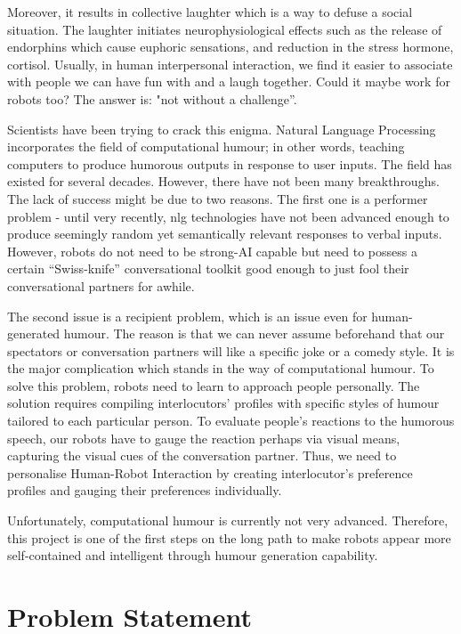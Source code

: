 Moreover, it results in collective laughter which is a way to defuse a social situation. The laughter initiates neurophysiological effects such as the release of endorphins which cause euphoric sensations, and reduction in the stress hormone, cortisol. Usually, in human interpersonal interaction, we find it easier to associate with people we can have fun with and a laugh together. Could it maybe work for robots too? The answer is: "not without a challenge”. 

Scientists have been trying to crack this enigma. Natural Language Processing incorporates the field of computational humour; in other words, teaching computers to produce humorous outputs in response to user inputs. The field has existed for several decades. However, there have not been many breakthroughs. The lack of success might be due to two reasons. The first one is a performer problem - until very recently, \acrfull{nlg} technologies have not been advanced enough to produce seemingly random yet semantically relevant responses to verbal inputs. However, robots do not need to be strong-AI capable but need to possess a certain “Swiss-knife” conversational toolkit good enough to just fool their conversational partners for awhile.

The second issue is a recipient problem, which is an issue even for human-generated humour. The reason is that we can never assume beforehand that our spectators or conversation partners will like a specific joke or a comedy style. It is the major complication which stands in the way of computational humour. To solve this problem, robots need to learn to approach people personally. The solution requires compiling interlocutors’ profiles with specific styles of humour tailored to each particular person. To evaluate people’s reactions to the humorous speech, our robots have to gauge the reaction perhaps via visual means, capturing the visual cues of the conversation partner. Thus, we need to personalise Human-Robot Interaction by creating interlocutor’s preference profiles and gauging their preferences individually.

Unfortunately, computational humour is currently not very advanced. Therefore, this project is one of the first steps on the long path to make robots appear more self-contained and intelligent through humour generation capability.

\section{Problem Statement}

